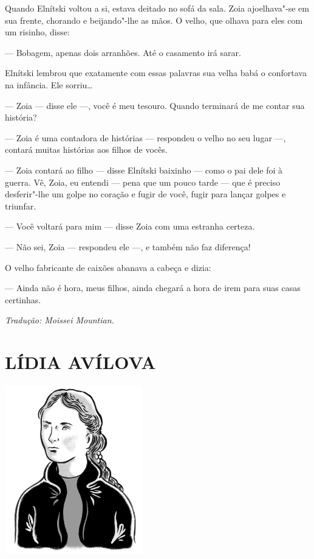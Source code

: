 Quando Elnítski voltou a si, estava deitado no sofá da sala. Zoia
ajoelhava"-se em sua frente, chorando e beijando"-lhe as mãos. O velho,
que olhava para eles com um risinho, disse:

--- Bobagem, apenas dois arranhões. Até o casamento irá sarar.

Elnítski lembrou que exatamente com essas palavras sua velha babá o
confortava na infância. Ele sorriu\ldots{}

--- Zoia --- disse ele ---, você é meu tesouro. Quando terminará de me
contar sua história?

--- Zoia é uma contadora de histórias --- respondeu o velho no seu lugar
---, contará muitas histórias aos filhos de vocês.

--- Zoia contará ao filho --- disse Elnítski baixinho --- como o pai
dele foi à guerra. Vê, Zoia, eu entendi --- pena que um pouco tarde ---
que é preciso desferir"-lhe um golpe no coração e fugir de você, fugir
para lançar golpes e triunfar.

--- Você voltará para mim --- disse Zoia com uma estranha certeza.

--- Não sei, Zoia --- respondeu ele ---, e também não faz diferença!

O velho fabricante de caixões abanava a cabeça e dizia:

--- Ainda não é hora, meus filhos, ainda chegará a hora de irem para
suas casas certinhas.

\medskip

{\footnotesize\hfill\emph{Tradução: Moissei Mountian.}}


\part[LÍDIA AVÍLOVA]{LÍDIA AVÍLOVA }

\pagebreak
\thispagestyle{empty}
\mbox{}
\vfill
\begin{center}
\includegraphics[width=6cm]{./imgs/autor8.jpg}
\end{center}


